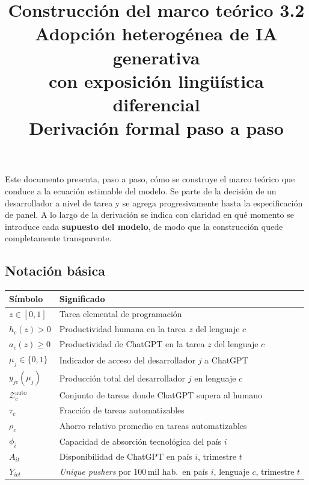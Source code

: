 \documentclass[11pt, a4paper]{article}
\title{%
  \textbf{Construcci\'on del marco te\'orico 3.2}\\[4pt]
  \large Adopci\'on heterog\'enea de IA generativa\\con exposici\'on ling\"u\'istica diferencial\\[2pt]
  \normalsize Derivaci\'on formal paso a paso
}
\author{}
\date{}
\begin{document}
\maketitle
\thispagestyle{empty}

\noindent
Este documento presenta, paso a paso, c\'omo se construye el marco te\'orico que
conduce a la ecuaci\'on estimable del modelo. Se parte de la decisi\'on de un
desarrollador a nivel de tarea y se agrega progresivamente hasta la
especificaci\'on de panel. A lo largo de la derivaci\'on se indica con claridad
en qu\'e momento se introduce cada \textbf{supuesto del modelo}, de modo que la
construcci\'on quede completamente transparente.

\bigskip

\subsection*{Notaci\'on b\'asica}

\begin{center}
\renewcommand{\arraystretch}{1.2}
\begin{tabular}{ll}
\toprule
\textbf{S\'imbolo} & \textbf{Significado} \\
\midrule
$z \in [0,1]$ & Tarea elemental de programaci\'on \\
$h_c(z) > 0$ & Productividad humana en la tarea $z$ del lenguaje $c$ \\
$a_c(z) \ge 0$ & Productividad de ChatGPT en la tarea $z$ del lenguaje $c$ \\
$\mu_j \in \{0,1\}$ & Indicador de acceso del desarrollador $j$ a ChatGPT \\
$y_{jc}(\mu_j)$ & Producci\'on total del desarrollador $j$ en lenguaje $c$ \\
$\mathcal{Z}^{\mathrm{auto}}_c$ & Conjunto de tareas donde ChatGPT supera al humano \\
$\tau_c$ & Fracci\'on de tareas automatizables \\
$\rho_c$ & Ahorro relativo promedio en tareas automatizables \\
$\phi_i$ & Capacidad de absorci\'on tecnol\'ogica del pa\'is $i$ \\
$A_{it}$ & Disponibilidad de ChatGPT en pa\'is $i$, trimestre $t$ \\
$Y_{ict}$ & \textit{Unique pushers} por 100\,mil hab.\ en pa\'is $i$, lenguaje $c$, trimestre $t$ \\
\bottomrule
\end{tabular}
\end{center}
\end{document}
